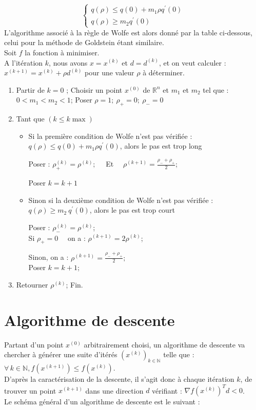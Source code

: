 \documentclass[12pt,a4paper,openay]{book}
\numberwithin{equation}{chapter}
\newcommand{\N}{\mathbb{N}}
\newcommand{\R}{\mathbb{R}}
\let\oldforall\forall
\renewcommand{\forall}{\oldforall\,}
\begin{document}
	$$
	\begin{cases}
	q(\rho) \leq q(0)+m_{1} \rho q^{\prime}(0) \\
	q(\rho) \geq m_{2} q^{\prime}(0)
	\end{cases}
	$$	
	L'algorithme associ\'e \`a la r\`egle de Wolfe est alors donn\'e par la table ci-dessous, celui pour la m\'ethode de Goldstein \'etant similaire.\\	
	Soit $f$ la fonction \`a minimiser.\\	
	A l'it\'eration $k$, nous avons $x=x^{(k)}$ et $d=d^{(k)}$, et on veut calculer : $x^{(k+1)}=x^{(k)}+\rho d^{(k)}$ pour une valeur $\rho$ \`a d\'eterminer.
	\begin{enumerate}
		\item Partir de $ k=0$ ; Choisir un point $x^{(0)}$ de  $\R^{n}$ et $m_1$ et $m_2$ tel que : $0<m_1<m_2<1$;			
		Poser $\rho=1;\ \rho_{+}=0;\ \rho_{-}=0$			
		\item Tant que $(k \leq k \max )$			
		\begin{itemize}
			\item Si la premi\`ere condition de Wolfe n'est pas v\'erifi\'ee :			
			$	q(\rho) \leq q(0)+m_1 \rho q^{\prime}(0)  	$, alors le pas est trop long
						
			Poser : $\rho_{+}^{(k)}=\rho^{(k)} ; \quad$ Et $\quad \rho^{(k+1)}=\frac{\rho_{-}+\rho_{+}}{2}$;
						
			Poser $k =  k+1$						
			\item Sinon si la deuxi\`eme condition de Wolfe n'est pas v\'erifi\'ee : $q(\rho) \geq m_2\  q^{\prime}(0) $, alors le pas est trop court
						
			Poser : $\rho_{-}^{(k)}=\rho^{(k)}$;\\		
			\hspace*{0.8cm}Si $\rho_{+}=0 \quad$ on a : $\rho^{(k+1)}=2 \rho^{(k)}$;
						
			\hspace*{0.8cm}Sinon, on a : $\rho^{(k+1)}=\frac{\rho_{-}+\rho_{+}}{2} ; \quad$\\			
			Poser $k = k+1$; 
		\end{itemize}			
		\item Retourner $\rho^{(k)}$; Fin.	
	\end{enumerate}
	
	
	\section{Algorithme de descente}	
	Partant d'un point $x^{(0)}$ arbitrairement choisi, un algorithme de descente va chercher \`a g\'en\'erer une suite d'it\'er\'es $\left(x^{(k)}\right)_{k \in \N}$ telle que :\\	
	$\forall k \in \N, f\left(x^{(k+1)}\right) \leq f\left(x^{(k)}\right)$.\\	
	D'apr\`es la caract\'erisation de la descente, il s'agit donc \`a chaque it\'eration $k$, de trouver un point $x^{(k+1)}$ dans une direction $d$ v\'erifiant : $\nabla f\left(x^{(k)}\right)^{T} d<0$.\\	
	Le sch\'ema g\'en\'eral d'un algorithme de descente est le suivant :
	
\end{document}
